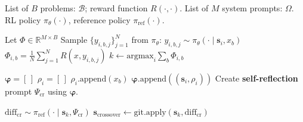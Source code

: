 \documentclass{article}
\theoremstyle{plain}
\theoremstyle{definition}
\theoremstyle{remark}
\begin{document}
\begin{algorithm}[t]
\caption{$\mathrm{Crossover}(\mathcal{B}, R, \Omega, \pi_{\theta}, \pi_{\text{ref}} )$}
    \label{alg:crossover}
    \begin{algorithmic}
         List of $B$ problems: $\mathcal{B}$; reward function $R(\cdot, \cdot)$.
         List of $M$ system prompts: $\Omega$.
         RL policy $\pi_{\theta}(\cdot)$, reference policy $\pi_{\text{ref}}(\cdot)$.
        \vspace{5pt}
        
        \STATE Let $\Phi \in \mathbb{R}^{M \times B}$ \hfill {}
                \STATE Sample $\{y_{i, b, j}\}_{j=1}^{N}$ from $\pi_{\theta}$: $y_{i, b, j}\sim \pi_{\theta}(\cdot \mid \mathbf{s}_{i}, x_{b})$ \hfill {}
                \STATE $\Phi_{i, b} = \frac{1}{N} {\sum}_{j=1}^{N} R(x, y_{i, b, j})$ 
            \ENDFOR
        \ENDFOR
        \STATE $k\leftarrow \mathrm{argmax}_{i} {\sum}_{b} \Phi_{i,b}$ \hfill {}
        \vspace{5pt}
        
        \STATE $\boldsymbol{\varphi} = [\,]$ \hfill {}
            \STATE $\rho_{i}=[\,]$ 
                    \STATE $\rho_{i}$.$\mathrm{append}(x_{b})$ \hfill {}
                \ENDIF
            \ENDFOR
            \STATE $\boldsymbol{\varphi}.\mathrm{append}((\mathbf{s}_{i}, \rho_{i}))$ \hfill {}
        \ENDFOR
        \STATE Create {\color{magenta}\textbf{{} self-reflection}} prompt $\Psi_{\text{cr}}$ using $\boldsymbol{\varphi}$.
        \vspace{5pt}
        
        \STATE $\mathrm{diff}_{\text{cr}} \sim \pi_{\text{ref}}(\cdot \mid \mathbf{s}_{k}, \Psi_{\text{cr}})$ 
        \STATE $\mathbf{s}_{\text{crossover}} \leftarrow \mathrm{git}.\mathrm{apply}(\mathbf{s}_{k}, \mathrm{diff}_{\text{cr}})$ \hfill  {}
        \vspace{5pt}
        

\end{algorithmic}
\end{algorithm}
\end{document}
